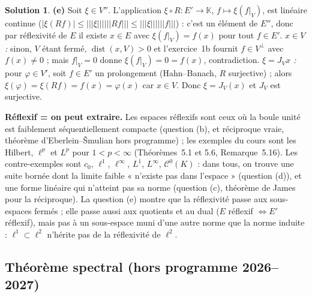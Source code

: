 \documentclass[11pt,a4paper]{article}
\newcommand{\K}{\mathbb{K}}
\newcommand{\dist}{\operatorname{dist}}
\newcommand{\opnorm}[1]{|\!|\!|#1|\!|\!|}
\newcommand{\Cz}{\mathcal{C}^0}
\theoremstyle{definition}
\newtheorem*{solution}{Solution}
\begin{document}
\begin{solution}
\medskip
\noindent\textbf{(e)} Soit $\xi\in V''$. L'application $\xi\circ R:E'\to\K$, $f\mapsto\xi(f|_V)$, est linéaire continue ($|\xi(Rf)|\le\opnorm\xi\opnorm{Rf}\le\opnorm\xi\opnorm f$) : c'est un élément de $E''$, donc par réflexivité de $E$ il existe $x\in E$ avec $\xi(f|_V)=f(x)$ pour tout $f\in E'$. \emph{$x\in V$ :} sinon, $V$ étant fermé, $\dist(x,V)>0$ et l'exercice~1b fournit $f\in V^\perp$ avec $f(x)\ne0$ ; mais $f|_V=0$ donne $\xi(f|_V)=0=f(x)$, contradiction. \emph{$\xi=J_Vx$ :} pour $\varphi\in V'$, soit $f\in E'$ un prolongement (Hahn--Banach, $R$ surjective) ; alors $\xi(\varphi)=\xi(Rf)=f(x)=\varphi(x)$ car $x\in V$. Donc $\xi=J_V(x)$ et $J_V$ est surjective.
\end{solution}

\begin{pointcle}
\textbf{Réflexif = on peut extraire.} Les espaces réflexifs sont ceux où la boule unité est faiblement séquentiellement compacte (question (b), et réciproque vraie, théorème d'Eberlein--Šmulian hors programme) ; les exemples du cours sont les Hilbert, $\ell^p$ et $L^p$ pour $1<p<\infty$ (Théorèmes~5.1 et 5.6, Remarque~5.16). Les contre-exemples sont $c_0$, $\ell^1$, $\ell^\infty$, $L^1$, $L^\infty$, $\Cz(K)$ : dans tous, on trouve une suite bornée dont la limite faible « n'existe pas dans l'espace » (question (d)), et une forme linéaire qui n'atteint pas sa norme (question (c), théorème de James pour la réciproque). La question (e) montre que la réflexivité passe aux sous-espaces fermés ; elle passe aussi aux quotients et au dual ($E$ réflexif $\iff E'$ réflexif), mais pas à un sous-espace muni d'une autre norme que la norme induite : $\ell^1\subset\ell^2$ n'hérite pas de la réflexivité de $\ell^2$.
\end{pointcle}

\subsection*{Théorème spectral (hors programme 2026--2027)}
\end{document}
